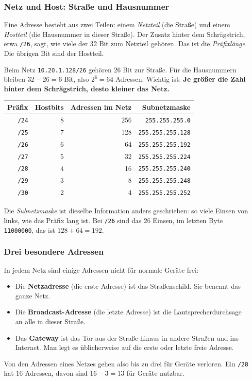 \documentclass[a4paper,12pt]{article}
\theoremstyle{definition}
\begin{document}
\subsubsection{Netz und Host: Straße und Hausnummer}

Eine Adresse besteht aus zwei Teilen: einem \emph{Netzteil} (die Straße) und einem \emph{Hostteil} (die Hausnummer in dieser Straße). Der Zusatz hinter dem Schrägstrich, etwa \texttt{/26}, sagt, wie viele der 32 Bit zum Netzteil gehören. Das ist die \emph{Präfixlänge}. Die übrigen Bit sind der Hostteil.

Beim Netz \texttt{10.20.1.128/26} gehören 26 Bit zur Straße. Für die Hausnummern bleiben $32-26 = 6$ Bit, also $2^6 = 64$ Adressen. Wichtig ist: \textbf{Je größer die Zahl hinter dem Schrägstrich, desto kleiner das Netz.}

\begin{center}
\begin{tabular}{rrrr}
\toprule
Präfix & Hostbits & Adressen im Netz & Subnetzmaske \\
\midrule
\texttt{/24} & 8 & 256 & \texttt{255.255.255.0} \\
\texttt{/25} & 7 & 128 & \texttt{255.255.255.128} \\
\texttt{/26} & 6 & 64 & \texttt{255.255.255.192} \\
\texttt{/27} & 5 & 32 & \texttt{255.255.255.224} \\
\texttt{/28} & 4 & 16 & \texttt{255.255.255.240} \\
\texttt{/29} & 3 & 8 & \texttt{255.255.255.248} \\
\texttt{/30} & 2 & 4 & \texttt{255.255.255.252} \\
\bottomrule
\end{tabular}
\end{center}

Die \emph{Subnetzmaske} ist dieselbe Information anders geschrieben: so viele Einsen von links, wie das Präfix lang ist. Bei \texttt{/26} sind das 26 Einsen, im letzten Byte \texttt{11000000}, das ist $128 + 64 = 192$.

\subsubsection{Drei besondere Adressen}

In jedem Netz sind einige Adressen nicht für normale Geräte frei:
\begin{itemize}
	\item Die \textbf{Netzadresse} (die erste Adresse) ist das Straßenschild. Sie benennt das ganze Netz.
	\item Die \textbf{Broadcast-Adresse} (die letzte Adresse) ist die Lautsprecherdurchsage \glqq an alle in dieser Straße\grqq.
	\item Das \textbf{Gateway} ist das Tor aus der Straße hinaus in andere Straßen und ins Internet. Man legt es üblicherweise auf die erste oder letzte freie Adresse.
\end{itemize}
Von den Adressen eines Netzes gehen also bis zu drei für Geräte verloren. Ein \texttt{/28} hat 16 Adressen, davon sind $16 - 3 = 13$ für Geräte nutzbar.
\end{document}
